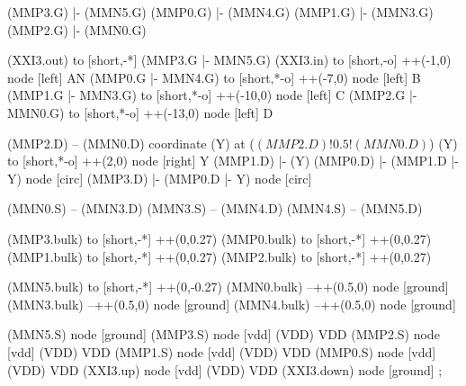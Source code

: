 \begin{circuitikz}[american]

	(MMP3.G) |- (MMN5.G)
	(MMP0.G) |- (MMN4.G)
	(MMP1.G) |- (MMN3.G)
	(MMP2.G) |- (MMN0.G)
	
	(XXI3.out) to [short,-*] (MMP3.G |- MMN5.G)
	(XXI3.in) to [short,-o] ++(-1,0) node [left] {AN}
	(MMP0.G |- MMN4.G) to [short,*-o] ++(-7,0) node [left] {B}
	(MMP1.G |- MMN3.G) to [short,*-o] ++(-10,0) node [left] {C}  
	(MMP2.G |- MMN0.G) to [short,*-o] ++(-13,0) node [left] {D}
	
	(MMP2.D) -- (MMN0.D)
	coordinate (Y) at ($(MMP2.D)!0.5!(MMN0.D)$)
	(Y) to [short,*-o] ++(2,0) node [right] {Y}
	(MMP1.D) |- (Y)
	(MMP0.D) |- (MMP1.D |- Y) node [circ] {}
	(MMP3.D) |- (MMP0.D |- Y) node [circ] {}
	
	(MMN0.S) -- (MMN3.D)
	(MMN3.S) -- (MMN4.D)
	(MMN4.S) -- (MMN5.D)
	
	(MMP3.bulk) to [short,-*] ++(0,0.27)
	(MMP0.bulk) to [short,-*] ++(0,0.27)
	(MMP1.bulk) to [short,-*] ++(0,0.27)
	(MMP2.bulk) to [short,-*] ++(0,0.27)
	
	(MMN5.bulk) to [short,-*] ++(0,-0.27)
	(MMN0.bulk) --++(0.5,0) node [ground] {}
	(MMN3.bulk) --++(0.5,0) node [ground] {}
	(MMN4.bulk) --++(0.5,0) node [ground] {}


	(MMN5.S) node [ground] {}
	(MMP3.S) node [vdd] (VDD) {VDD}
	(MMP2.S) node [vdd] (VDD) {VDD}
	(MMP1.S) node [vdd] (VDD) {VDD}
	(MMP0.S) node [vdd] (VDD) {VDD}
	(XXI3.up) node [vdd] (VDD) {VDD}
	(XXI3.down) node [ground] {}
;

\end{circuitikz}
